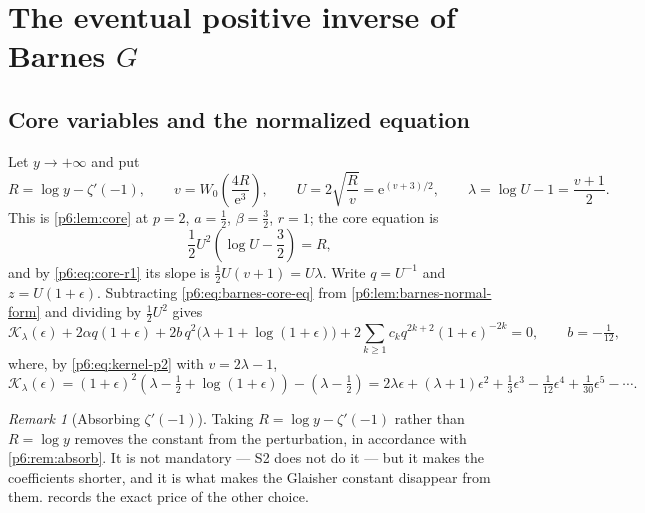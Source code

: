 \documentclass[11pt,a4paper,oneside]{book}
\theoremstyle{plain}
\theoremstyle{definition}
\theoremstyle{remark}
\newtheorem{remark}[theorem]{Remark}
\newcommand{\e}{\mathrm{e}}
\newcommand{\Wlam}{W}
\begin{document}
\section{The eventual positive inverse of Barnes \texorpdfstring{$G$}{G}}
\label{p6:sec:barnes}

\subsection{Core variables and the normalized equation}

Let $y\to+\infty$ and put
\begin{equation}\label{p6:eq:barnes-core-vars}
 R=\log y-\zeta'(-1),
 \qquad
 v=\Wlam_0\!\left(\frac{4R}{\e^{3}}\right),
 \qquad
 U=2\sqrt{\frac Rv}=\e^{(v+3)/2},
 \qquad
 \lambda=\log U-1=\frac{v+1}2 .
\end{equation}
This is \cref{p6:lem:core} at $p=2$, $a=\tfrac12$, $\beta=\tfrac32$, $r=1$;
the core equation is
\begin{equation}\label{p6:eq:barnes-core-eq}
 \frac12U^{2}\left(\log U-\frac32\right)=R,
\end{equation}
and by \eqref{p6:eq:core-r1} its slope is
$\tfrac12U(v+1)=U\lambda$.  Write $q=U^{-1}$ and $z=U(1+\epsilon)$.
Subtracting \eqref{p6:eq:barnes-core-eq} from
\cref{p6:lem:barnes-normal-form} and dividing by $\tfrac12U^{2}$ gives
\begin{equation}\label{p6:eq:barnes-normalized}
 \mathcal{K}_{\lambda}(\epsilon)
 +2\alpha q(1+\epsilon)
 +2b\,q^{2}\bigl(\lambda+1+\log(1+\epsilon)\bigr)
 +2\sum_{k\ge1}c_kq^{2k+2}(1+\epsilon)^{-2k}=0,
 \qquad b=-\tfrac1{12},
\end{equation}
where, by \eqref{p6:eq:kernel-p2} with $v=2\lambda-1$,
\begin{equation}\label{p6:eq:barnes-kernel}
 \mathcal{K}_{\lambda}(\epsilon)
 =(1+\epsilon)^{2}\left(\lambda-\tfrac12+\log(1+\epsilon)\right)
 -\left(\lambda-\tfrac12\right)
 =2\lambda\epsilon+(\lambda+1)\epsilon^{2}
 +\tfrac13\epsilon^{3}-\tfrac1{12}\epsilon^{4}+\tfrac1{30}\epsilon^{5}-\cdots .
\end{equation}

\begin{remark}[Absorbing $\zeta'(-1)$]\label{p6:rem:absorb-zeta}
Taking $R=\log y-\zeta'(-1)$ rather than $R=\log y$ removes the constant from
the perturbation, in accordance with \cref{p6:rem:absorb}.  It is not
mandatory --- S2 does not do it --- but it makes the coefficients shorter, and
it is what makes the Glaisher constant disappear from them.
 records the exact price of the other choice.
\end{remark}
\end{document}

